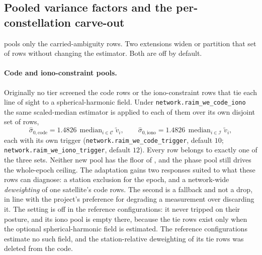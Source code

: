 \documentclass[main.tex]{subfiles}
\begin{document}
\subsection{Pooled variance factors and the per-constellation carve-out}
\label{sec:stoch-net-pools}

 pools only the carried-ambiguity rows.
Two extensions widen or partition that set of rows without changing the
estimator.  Both are off by default.

\paragraph{Code and iono-constraint pools.}  Originally no tier screened
the code rows or the iono-constraint rows that tie each line of sight to
a spherical-harmonic field.  Under
\texttt{network.raim\_we\_code\_iono} the same scaled-median estimator is
applied to each of them over its own disjoint set of rows,
\begin{equation}
\hat\sigma_{0,\mathrm{code}}
  = 1.4826\,\operatorname{median}_{i\in\mathcal{C}} \tilde v_i,
\qquad
\hat\sigma_{0,\mathrm{iono}}
  = 1.4826\,\operatorname{median}_{i\in\mathcal{I}} \tilde v_i,
\label{eq:qc-sigma0-pools}
\end{equation}
each with its own trigger (\texttt{network.raim\_we\_code\_trigger}, default $10$;
\texttt{network.raim\_we\_iono\_trigger}, default $12$).  Every row belongs to
exactly one of the three sets.  Neither new pool has the floor of
, and
the phase pool still drives the whole-epoch ceiling.  The adaptation
gains two responses suited to what these rows can diagnose: a station
exclusion for the epoch, and a network-wide \emph{deweighting} of one
satellite's code rows.  The second is a fallback and not a drop, in line
with the project's preference for degrading a measurement over
discarding it.  The setting is off in the reference configurations: it never tripped
on their posture, and its iono pool is empty there, because the tie rows
exist only when the optional spherical-harmonic field is estimated.
The reference configurations estimate no such field, and the
station-relative deweighting of its tie rows was deleted from the code.
\end{document}
